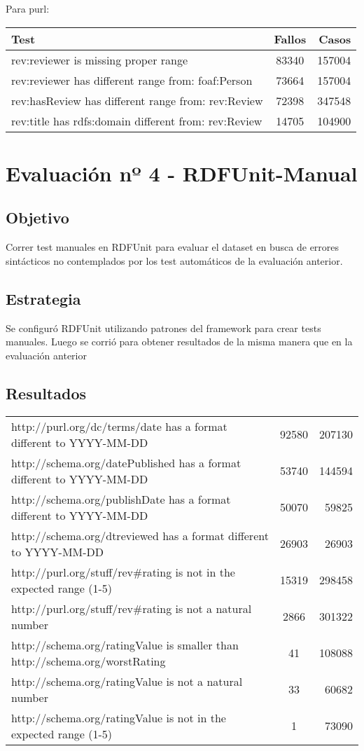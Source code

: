 Para purl:

\begin{tabular}{| l | c | r | }\hline
Test & Fallos & Casos \\\hline
rev:reviewer is missing proper range & 83340 & 157004\\
rev:reviewer has different range from: foaf:Person & 73664 & 157004\\
rev:hasReview has different range from: rev:Review & 72398 & 347548\\
rev:title has rdfs:domain different from: rev:Review & 14705 & 104900 \hline
\end{tabular}

\section{Evaluación nº 4 - RDFUnit-Manual}
\label{section:evaluacion-manual}

\subsection*{Objetivo} Correr test manuales en RDFUnit para evaluar el dataset en busca de errores sintácticos no contemplados por los test
automáticos de la evaluación anterior.

\subsection*{Estrategia} Se configuró RDFUnit utilizando patrones del framework para crear tests manuales. Luego se corrió para obtener resultados
de la misma manera que en la evaluación anterior

\subsection*{Resultados}
\begin{tabular}{| l | c | r | }
http://purl.org/dc/terms/date has a format different to YYYY-MM-DD & 92580 & 207130\\
http://schema.org/datePublished has a format different to YYYY-MM-DD & 53740 & 144594\\
http://schema.org/publishDate has a format different to YYYY-MM-DD & 50070 & 59825\\
http://schema.org/dtreviewed has a format different to YYYY-MM-DD & 26903 & 26903\\ 
http://purl.org/stuff/rev\#rating is not in the expected range (1-5) & 15319 & 298458\\
http://purl.org/stuff/rev\#rating is not a natural number & 2866 & 301322\\
http://schema.org/ratingValue is smaller than http://schema.org/worstRating & 41 & 108088 \\
http://schema.org/ratingValue is not a natural number & 33 & 60682\\
http://schema.org/ratingValue is not in the expected range (1-5) & 1 & 73090 
\end{tabular}

